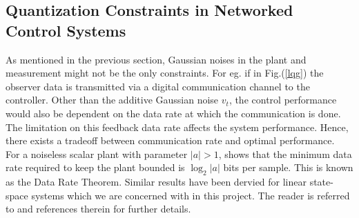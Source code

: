 \documentclass[a4paper,12pt]{article}
\begin{document}
	\subsection{Quantization Constraints in Networked Control Systems}
	As mentioned in the previous section, Gaussian noises in the plant and measurement might not be the only constraints. For eg. if in Fig.(\ref{lqg}) the observer data is transmitted via a digital communication channel to the controller. Other than the additive Gaussian noise $v_{t}$, the control performance would also be dependent on the data rate at which the communication is done. The limitation on this feedback data rate affects the system performance. Hence, there exists a tradeoff between communication rate and optimal performance. \\
	For a noiseless scalar plant with parameter $|a|>1$, \cite{quantpaper} shows that the minimum data rate required to keep the plant bounded is $\log_{2}|a|$ bits per sample. This is known as the Data Rate Theorem. Similar results have been dervied for linear state-space systems which we are concerned with in this project. The reader is referred to \cite{quantoverview} and references therein for further details. \\
	
\end{document}
